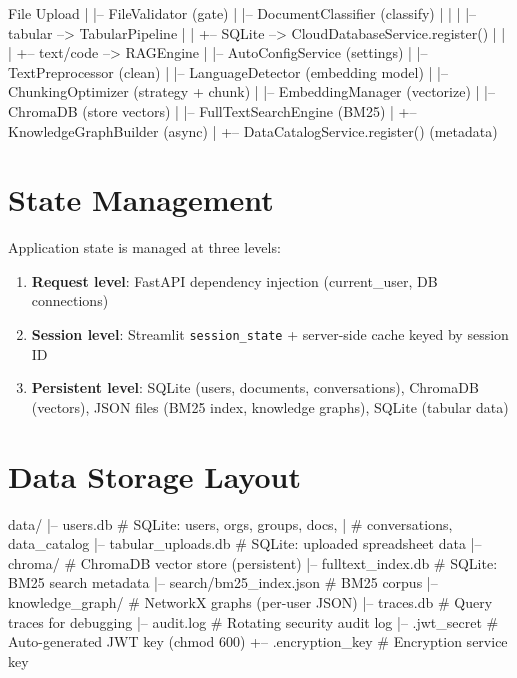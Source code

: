 \documentclass[12pt, a4paper, oneside]{report}
\newcommand{\kw}[1]{\texttt{\small #1}}
\begin{document}
\begin{codebox}
File Upload
    |
    |-- FileValidator (gate)
    |
    |-- DocumentClassifier (classify)
    |       |
    |       |-- tabular --> TabularPipeline
    |       |       +-- SQLite --> CloudDatabaseService.register()
    |       |
    |       +-- text/code --> RAGEngine
    |               |-- AutoConfigService  (settings)
    |               |-- TextPreprocessor  (clean)
    |               |-- LanguageDetector  (embedding model)
    |               |-- ChunkingOptimizer (strategy + chunk)
    |               |-- EmbeddingManager  (vectorize)
    |               |-- ChromaDB          (store vectors)
    |               |-- FullTextSearchEngine (BM25)
    |               +-- KnowledgeGraphBuilder (async)
    |
    +-- DataCatalogService.register() (metadata)
\end{codebox}

\section{State Management}

Application state is managed at three levels:
\begin{enumerate}
  \item \textbf{Request level}: FastAPI dependency injection (current\_user, DB connections)
  \item \textbf{Session level}: Streamlit \kw{session\_state} + server-side cache keyed by session ID
  \item \textbf{Persistent level}: SQLite (users, documents, conversations), ChromaDB (vectors),
        JSON files (BM25 index, knowledge graphs), SQLite (tabular data)
\end{enumerate}

\section{Data Storage Layout}

\begin{codebox}
data/
|-- users.db              # SQLite: users, orgs, groups, docs,
|                         #         conversations, data_catalog
|-- tabular_uploads.db    # SQLite: uploaded spreadsheet data
|-- chroma/               # ChromaDB vector store (persistent)
|-- fulltext_index.db     # SQLite: BM25 search metadata
|-- search/bm25_index.json  # BM25 corpus
|-- knowledge_graph/      # NetworkX graphs (per-user JSON)
|-- traces.db             # Query traces for debugging
|-- audit.log             # Rotating security audit log
|-- .jwt_secret           # Auto-generated JWT key (chmod 600)
+-- .encryption_key       # Encryption service key
\end{codebox}
\end{document}
